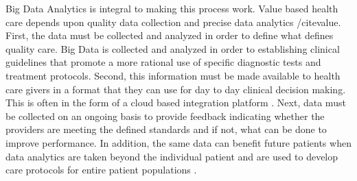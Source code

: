 \documentclass[sigconf]{acmart}
\begin{document}
Big Data Analytics is integral to making this process work. Value based health care depends upon quality data collection and precise data analytics /cite{value}.  First, the data must be collected and analyzed in order to define what defines quality care. Big Data is collected and analyzed in order to establishing clinical guidelines that promote a more rational use of specific diagnostic tests and treatment protocols.  Second, this information must be made available to health care givers in a format that they can use for day to day clinical decision making. This is often in the form of a cloud based integration platform \cite{value}.  Next, data must be collected on an ongoing basis to provide feedback indicating whether  the providers are meeting the defined standards and if not, what can be done to improve performance. In addition, the same data can benefit future patients when data analytics are taken beyond the individual patient and are used to develop care protocols for entire patient populations \cite{value}. 
\end{document}
